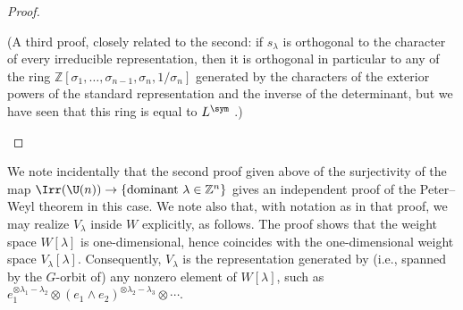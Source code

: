 \documentclass[reqno]{amsart} 
\begin{document}
\begin{proof}
\begin{enumerate}
    (A third proof, closely related to the second: if $s_\lambda$ is orthogonal to the character of every irreducible representation, then it is orthogonal in particular to any of the ring $\mathbb{Z}[\sigma_1, \dotsc, \sigma_{n-1}, \sigma_n, 1/\sigma_n]$ generated by the characters of the exterior powers of the standard representation and the inverse of the determinant, but we have seen that this ring is equal to $L^{\sym}$ .)
  \end{enumerate}
\end{proof}
We note incidentally that the second proof given above of the surjectivity of the map $\Irr(\U(n)) \rightarrow \{\text{dominant } \lambda \in \mathbb{Z}^n\}$ gives an independent proof of the Peter--Weyl theorem in this case.  We note also that, with notation as in that proof, we may realize $V_\lambda$ inside $W$ explicitly, as follows.  The proof shows that the weight space $W[\lambda]$ is one-dimensional, hence coincides with the one-dimensional weight space $V_\lambda[\lambda]$.  Consequently, $V_\lambda$ is the representation generated by (i.e., spanned by the $G$-orbit of) any nonzero element of $W[\lambda]$, such as $e_1^{\otimes \lambda_1 - \lambda_2} \otimes (e_1 \wedge e_2)^{\otimes \lambda_2 - \lambda_3} \otimes \dotsb$.
\end{document}
